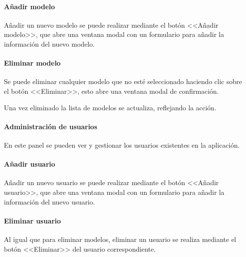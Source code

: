 
\paragraph{Añadir modelo}

Añadir un nuevo modelo se puede realizar mediante el botón <<Añadir modelo>>,
que abre una ventana modal con un formulario para añadir la información del
nuevo modelo.


\paragraph{Eliminar modelo}

Se puede eliminar cualquier modelo que no esté seleccionado haciendo clic sobre
el botón <<Eliminar>>, esto abre una ventana modal de confirmación.


Una vez eliminado la lista de modelos se actualiza, reflejando la acción.

\paragraph{Administración de usuarios}

En este panel se pueden ver y gestionar los usuarios existentes en la
aplicación.

\paragraph{Añadir usuario}

Añadir un nuevo usuario se puede realizar mediante el botón <<Añadir usuario>>,
que abre una ventana modal con un formulario para añadir la información del
nuevo usuario.


\paragraph{Eliminar usuario}

Al igual que para eliminar modelos, eliminar un usuario se realiza mediante el
botón <<Eliminar>> del usuario correspondiente.


